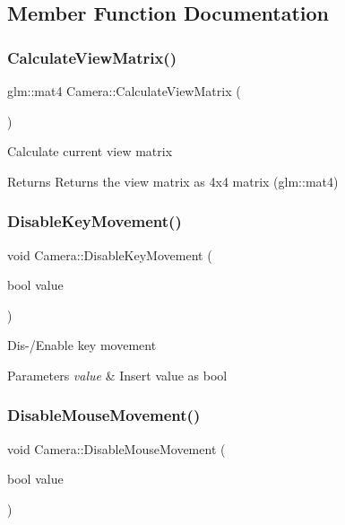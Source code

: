 \subsection{Member Function Documentation}
\mbox{\label{class_camera_ab3e898442f97de71f3bbeeebf98082d8}} 
\subsubsection{\texorpdfstring{CalculateViewMatrix()}{CalculateViewMatrix()}}
{\footnotesize\ttfamily glm\+::mat4 Camera\+::\+Calculate\+View\+Matrix (\begin{DoxyParamCaption}{ }\end{DoxyParamCaption})}

Calculate current view matrix \begin{DoxyReturn}{Returns}
Returns the view matrix as 4x4 matrix (glm\+::mat4) 
\end{DoxyReturn}
\mbox{\label{class_camera_ae1e7ad116cf9779f19f572fcf3f64fbd}} 
\subsubsection{\texorpdfstring{DisableKeyMovement()}{DisableKeyMovement()}}
{\footnotesize\ttfamily void Camera\+::\+Disable\+Key\+Movement (\begin{DoxyParamCaption}\item[{bool}]{value }\end{DoxyParamCaption})}

Dis-\//\+Enable key movement 
\begin{DoxyParams}{Parameters}
{\em value} & Insert value as bool \\
\hline
\end{DoxyParams}
\mbox{\label{class_camera_a164c6872bbcdf14cefda7fa8e73ba998}} 
\subsubsection{\texorpdfstring{DisableMouseMovement()}{DisableMouseMovement()}}
{\footnotesize\ttfamily void Camera\+::\+Disable\+Mouse\+Movement (\begin{DoxyParamCaption}\item[{bool}]{value }\end{DoxyParamCaption})}

